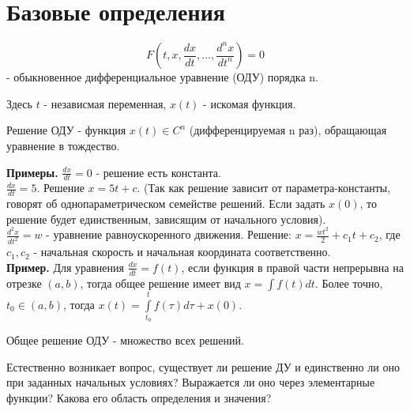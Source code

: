 \section{Базовые определения}

\begin{defin}
\begin{equation}
    F(t,x,\frac{dx}{dt},...,\frac{d^n x}{dt^n})=0 \label{ODE}
\end{equation}
- обыкновенное дифференциальное уравнение (ОДУ) порядка n.
\end{defin}
Здесь $t$ - независмая переменная,  $x(t)$ - искомая функция.
\begin{defin}
Решение ОДУ - функция $x(t)\in C^n$ (дифференцируемая n раз), обращающая
уравнение в тождество.
\end{defin}
\textbf{Примеры.} $\frac{dx}{dt}=0 $ - решение есть константа.\\
$\frac{dx}{dt}=5$. Решение $x=5t+c$.
(Так как решение зависит от параметра-константы, говорят об однопараметрическом
семействе решений. Если задать $x(0)$, то решение будет единственным, 
зависящим от начального условия).\\
$\frac{d^2 x}{dt^2}=w$ - уравнение равноускоренного 
движения. Решение: $x=\frac{wt^2}{2}+c_1t+c_2$, где  $c_1,c_2$ - начальная 
скорость и начальная координата соответственно. \\
\textbf{Пример.} Для уравнения $\frac{dx}{dt} =f(t)$, если 
функция в правой части непрерывна на отрезке $(a,b)$, тогда общее решение
имеет вид $x=\int f(t)dt$. Более точно, $t_0\in(a,b)$, тогда
$x(t)=\int\limits^t_{t_0}f(\tau)d\tau+x(0)$.
\begin{defin}
Общее решение ОДУ - множество всех решений.
\end{defin}
Естественно возникает вопрос, существует ли решение ДУ и единственно ли оно
при заданных начальных условиях? Выражается ли оно через элементарные функции?
Какова его область определения и значения?

